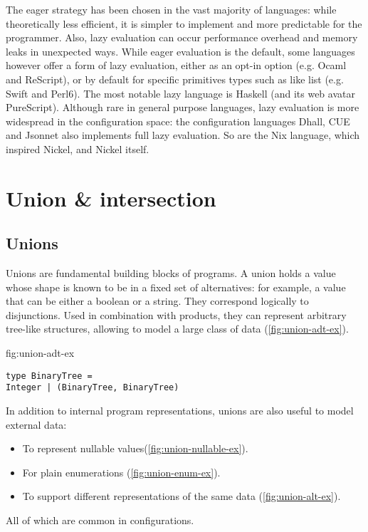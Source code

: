 \documentclass[sigplan,10pt,review,anonymous]{acmart}
\newcommand{\info}[2][1=]{}
\newcommand{\change}[2]{}
\begin{document}
The eager strategy has been chosen in the vast majority of languages: while
theoretically less efficient, it is simpler to implement and more predictable
for the programmer. Also, lazy evaluation can occur performance overhead and
memory leaks in unexpected ways. While eager evaluation is the default, some
languages however offer a form of lazy evaluation, either as an opt-in option
(e.g. Ocaml and ReScript), or by default for specific primitives types such as
like list (e.g.  Swift and Perl6). The most notable lazy language is Haskell
(and its web avatar PureScript). Although rare in general purpose languages,
lazy evaluation is more widespread in the configuration space: the configuration
languages Dhall, CUE and Jsonnet also implements full lazy evaluation. So are
the Nix language, which inspired Nickel, and Nickel itself.

\newpage

\section{Union \& intersection}
\info{What are they, what are they used for.}

\subsection*{Unions}
Unions are fundamental building blocks of programs. A union holds a value whose
shape is known to be in a fixed set of alternatives: for example, a value that
can be either a boolean or a string. They correspond logically to disjunctions.
Used in combination with products, they can represent arbitrary tree-like
structures, allowing to model a large class of data
(\ref{fig:union-adt-ex}).


\change{These next few labels need to be inside figures,
they are not working}
\label{fig:union-adt-ex}
\begin{lstlisting}[title={Tree-like data structure}]
type BinaryTree =
Integer | (BinaryTree, BinaryTree)
\end{lstlisting}


In addition to internal program representations, unions are also useful to model
external data:
\begin{itemize}
    \item To represent nullable values(\ref{fig:union-nullable-ex}).
    \item For plain enumerations (\ref{fig:union-enum-ex}).
    \item To support different representations of the same data
        (\ref{fig:union-alt-ex}).
\end{itemize}
All of which are common in configurations.
\end{document}

